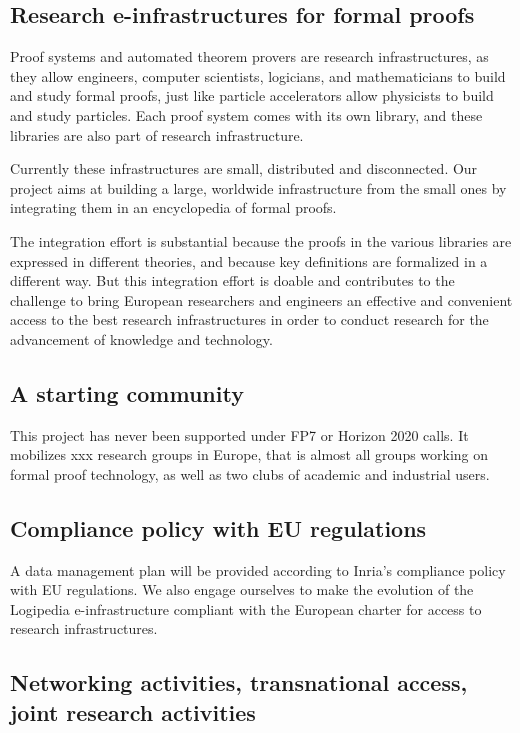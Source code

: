 \subsection{Research e-infrastructures for formal proofs}

Proof systems and automated theorem provers are research
infrastructures, as they allow engineers, computer scientists, logicians, and
mathematicians to build and study formal proofs, just like particle
accelerators allow physicists to build and study particles. Each proof
system comes with its own library, and these libraries are also
part of research infrastructure.

Currently these infrastructures are small, distributed and
disconnected.  Our project aims at building a large, worldwide
infrastructure from the small ones by integrating them in an
encyclopedia of formal proofs.

The integration effort is substantial because the proofs in the
various libraries are expressed in different theories, and because
key definitions are formalized in a different way.
%
But this
integration effort is doable and contributes to the challenge to bring
European researchers and engineers an effective and convenient access
to the best research infrastructures in order to conduct research for
the advancement of knowledge and technology.

\subsection{A starting community}

This project has never been supported under FP7 or Horizon 2020 calls.
It mobilizes xxx research groups in Europe, that is almost all groups
working on formal proof technology, as well as two clubs of academic
and industrial users.

\subsection{Compliance policy with EU regulations}

A data management plan will be provided according to Inria’s
compliance policy with EU regulations. We also engage ourselves to
make the evolution of the {\sc Logipedia} e-infrastructure compliant
with the European charter for access to research infrastructures.

\subsection{Networking activities, transnational access, joint research activities}

